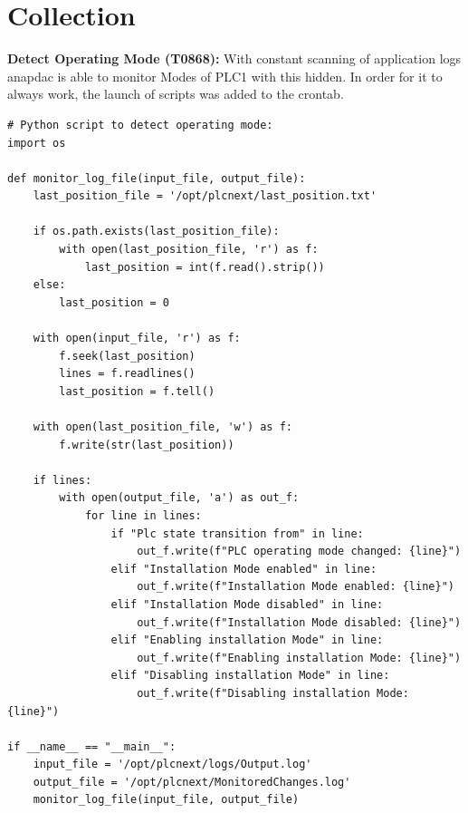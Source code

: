 \documentclass[Master,BMR,english]{twbook}
\begin{document}
\section*{Collection}

\textbf{Detect Operating Mode (T0868):} With constant scanning of application logs anapdac is able to monitor Modes of PLC1 with this hidden. In order for it to always work, the launch of scripts was added to the crontab.

\begin{listing}[htbp]
\begin{verbatim}
# Python script to detect operating mode:
import os

def monitor_log_file(input_file, output_file):
    last_position_file = '/opt/plcnext/last_position.txt'

    if os.path.exists(last_position_file):
        with open(last_position_file, 'r') as f:
            last_position = int(f.read().strip())
    else:
        last_position = 0

    with open(input_file, 'r') as f:
        f.seek(last_position)
        lines = f.readlines()
        last_position = f.tell()

    with open(last_position_file, 'w') as f:
        f.write(str(last_position))

    if lines:
        with open(output_file, 'a') as out_f:
            for line in lines:
                if "Plc state transition from" in line:
                    out_f.write(f"PLC operating mode changed: {line}")
                elif "Installation Mode enabled" in line:
                    out_f.write(f"Installation Mode enabled: {line}")
                elif "Installation Mode disabled" in line:
                    out_f.write(f"Installation Mode disabled: {line}")
                elif "Enabling installation Mode" in line:
                    out_f.write(f"Enabling installation Mode: {line}")
                elif "Disabling installation Mode" in line:
                    out_f.write(f"Disabling installation Mode: {line}")

if __name__ == "__main__":
    input_file = '/opt/plcnext/logs/Output.log'
    output_file = '/opt/plcnext/MonitoredChanges.log'
    monitor_log_file(input_file, output_file)
\end{verbatim}
\caption{Detect Operating Mode Script}
\end{listing}
\end{document}
